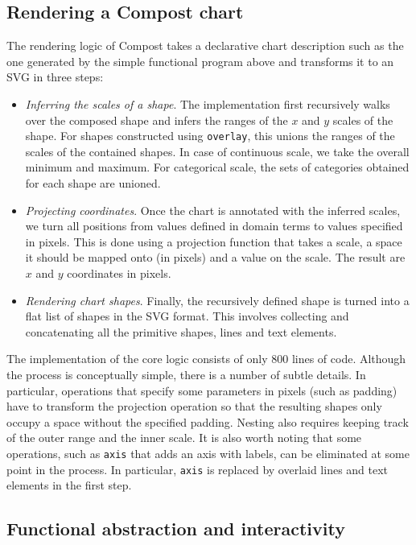 \documentclass[fleqn,11pt]{report}
\theoremstyle{definition}
\newenvironment{nitemize}
{ \vspace{-0.4em}
  \begin{itemize}
    \setlength{\itemsep}{5pt}
    \setlength{\parskip}{0pt}
    \setlength{\parsep}{0pt} }
{ \end{itemize}
  \vspace{-0.4em} }
\begin{document}
\subsection{Rendering a Compost chart}

The rendering logic of Compost takes a declarative chart description such as the one generated
by the simple functional program above and transforms it to an SVG in three steps:

\begin{nitemize}
\item \emph{Inferring the scales of a shape}. The implementation first recursively walks over
  the composed shape and infers the ranges of the $x$ and $y$ scales of the shape. For shapes
  constructed using \texttt{overlay}, this unions the ranges of the scales of the contained
  shapes. In case of continuous scale, we take the overall minimum and maximum. For categorical
  scale, the sets of categories obtained for each shape are unioned.

\item \emph{Projecting coordinates}. Once the chart is annotated with the inferred scales, we
  turn all positions from values defined in domain terms to values specified in pixels. This
  is done using a projection function that takes a scale, a space it should be mapped onto
  (in pixels) and a value on the scale. The result are $x$ and $y$ coordinates in pixels.

\item \emph{Rendering chart shapes}. Finally, the recursively defined shape is turned into
  a flat list of shapes in the SVG format. This involves collecting and concatenating
  all the primitive shapes, lines and text elements.
\end{nitemize}

The implementation of the core logic consists of only 800 lines of code. Although the
process is conceptually simple, there is a number of subtle details. In particular,
operations that specify some parameters in pixels (such as padding) have to transform the
projection operation so that the resulting shapes only occupy a space without the specified padding.
Nesting also requires keeping track of the outer range and the inner scale. It is also worth
noting that some operations, such as \texttt{axis} that adds an axis with labels, can be eliminated
at some point in the process. In particular, \texttt{axis} is replaced by overlaid lines and text
elements in the first step.

\subsection{Functional abstraction and interactivity}
\end{document}
